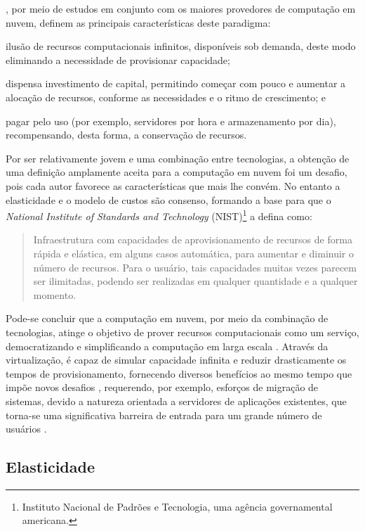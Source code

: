 \documentclass[english,brazilian]{UNISINOSmonografia} %
\begin{document}
, por meio de estudos em conjunto com os maiores provedores de computação em nuvem, definem as principais características deste paradigma:
\begin{inparaenum}
	\item ilusão de recursos computacionais infinitos, disponíveis sob demanda, deste modo eliminando a necessidade de provisionar capacidade;
	\item dispensa investimento de capital, permitindo começar com pouco e aumentar a alocação de recursos, conforme as necessidades e o ritmo de crescimento; e
	\item pagar pelo uso (por exemplo, servidores por hora e armazenamento por dia), recompensando, desta forma, a conservação de recursos.
\end{inparaenum}


Por ser relativamente jovem e uma combinação entre tecnologias, a obtenção de uma definição amplamente aceita para a computação em nuvem foi um desafio, pois cada autor favorece as características que mais lhe convém.
No entanto a elasticidade e o modelo de custos são consenso, formando a base para que o \textit{National Institute of Standards and Technology} (NIST)\footnote{
	Instituto Nacional de Padrões e Tecnologia, uma agência governamental americana.
} a defina como:

\begin{quote}
	Infraestrutura com capacidades de aprovisionamento de recursos de forma rápida e elástica, em alguns
	casos automática, para aumentar e diminuir o número de recursos. Para o usuário, tais capacidades muitas vezes
	parecem ser ilimitadas, podendo ser realizadas em qualquer quantidade e a qualquer momento.
\end{quote}

Pode-se concluir que a computação em nuvem, por meio da combinação de tecnologias, atinge o objetivo de prover recursos computacionais como um serviço, democratizando e simplificando a computação em larga escala \cite{Awada2017}.
Através da virtualização, é capaz de simular capacidade infinita e reduzir drasticamente os tempos de provisionamento, fornecendo diversos benefícios ao mesmo tempo que impõe novos desafios \cite{Zhang2010}, requerendo, por exemplo, esforços de migração de sistemas, devido a natureza orientada a servidores de aplicações existentes, que torna-se uma significativa barreira de entrada para um grande número de usuários \cite{Jonas2017}.

\subsection{Elasticidade}
\label{sec:elasticidade}
\end{document}
